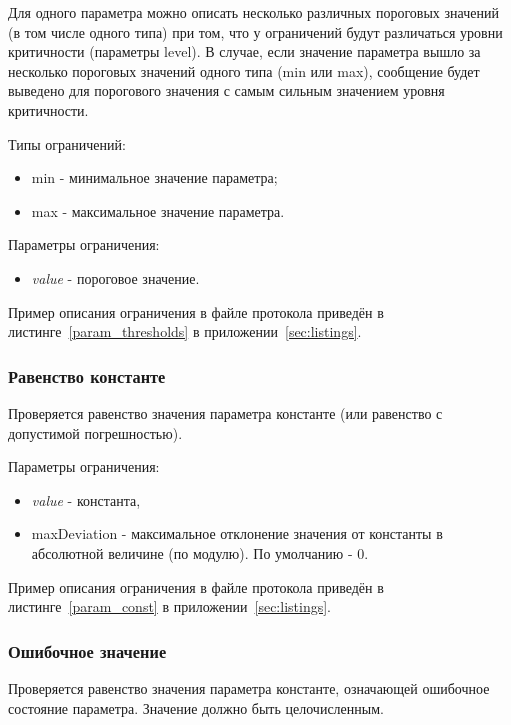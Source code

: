 Для одного параметра можно описать несколько различных пороговых значений (в 
том числе одного типа) при том, что у ограничений будут различаться уровни 
критичности (параметры level). В случае, если значение параметра вышло за 
несколько пороговых значений одного типа (min или max), сообщение будет 
выведено для порогового значения с самым сильным значением уровня критичности.

Типы ограничений:

\begin{itemize}
 \item min - минимальное значение параметра;
 \item max - максимальное значение параметра.
\end{itemize}

Параметры ограничения:

\begin{itemize}
 \item \textit{value} - пороговое значение.
\end{itemize}

Пример описания ограничения в файле протокола приведён в 
листинге~\ref{param_thresholds} в приложении~\ref{sec:listings}.


\subsubsection{Равенство константе}

Проверяется равенство значения параметра константе (или равенство 
с допустимой погрешностью).

Параметры ограничения:
\begin{itemize}
 \item \textit{value} - константа,
 \item maxDeviation - максимальное отклонение значения от константы в 
абсолютной величине (по модулю). По умолчанию - 0.
\end{itemize}

Пример описания ограничения в файле протокола приведён в 
листинге~\ref{param_const} в приложении~\ref{sec:listings}.


\subsubsection{Ошибочное значение}

Проверяется равенство значения параметра константе, означающей 
ошибочное состояние параметра. Значение должно быть целочисленным.

